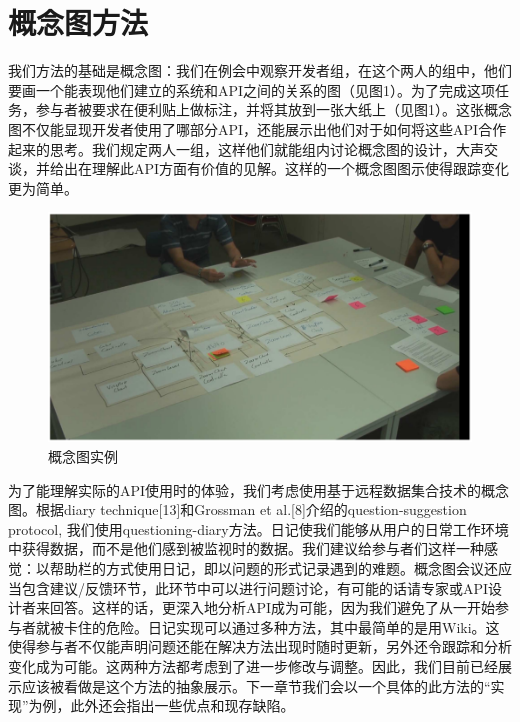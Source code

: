 \section*{概念图方法}
我们方法的基础是概念图：我们在例会中观察开发者组，在这个两人的组中，他们要画一个能表现他们建立的系统和API之间的关系的图（见图1）。为了完成这项任务，参与者被要求在便利贴上做标注，并将其放到一张大纸上（见图1）。这张概念图不仅能显现开发者使用了哪部分API，还能展示出他们对于如何将这些API合作起来的思考。我们规定两人一组，这样他们就能组内讨论概念图的设计，大声交谈，并给出在理解此API方面有价值的见解。这样的一个概念图图示使得跟踪变化更为简单。
\begin{figure}[!h]
  \begin{center}
    \includegraphics[scale=0.3]{figures/translation/translation_api_fig1.png}\\
    概念图实例
  \end{center}
\end{figure}

为了能理解实际的API使用时的体验，我们考虑使用基于远程数据集合技术的概念图。根据diary technique[13]和Grossman et al.[8]介绍的question-suggestion protocol, 我们使用questioning-diary方法。日记使我们能够从用户的日常工作环境中获得数据，而不是他们感到被监视时的数据。我们建议给参与者们这样一种感觉：以帮助栏的方式使用日记，即以问题的形式记录遇到的难题。概念图会议还应当包含建议/反馈环节，此环节中可以进行问题讨论，有可能的话请专家或API设计者来回答。这样的话，更深入地分析API成为可能，因为我们避免了从一开始参与者就被卡住的危险。日记实现可以通过多种方法，其中最简单的是用Wiki。这使得参与者不仅能声明问题还能在解决方法出现时随时更新，另外还令跟踪和分析变化成为可能。这两种方法都考虑到了进一步修改与调整。因此，我们目前已经展示应该被看做是这个方法的抽象展示。下一章节我们会以一个具体的此方法的“实现”为例，此外还会指出一些优点和现存缺陷。
